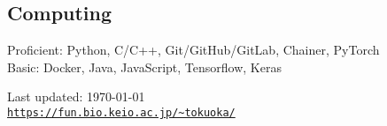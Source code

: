 \documentclass[letterpaper]{article}
\def\footerlink{https://fun.bio.keio.ac.jp/\~tokuoka/}
\begin{document}
\subsection*{\bf Computing}
Proficient: Python, C/C++, Git/GitHub/GitLab, Chainer, PyTorch \\
Basic: Docker, Java, JavaScript, Tensorflow, Keras

\bigskip

\begin{center}
  \begin{footnotesize}
    Last updated: \today \\
    \href{\footerlink}{\texttt{\url{\footerlink}}}
  \end{footnotesize}
\end{center}
\end{document}
